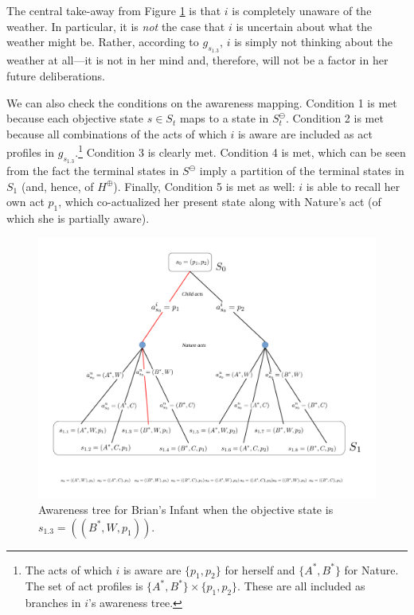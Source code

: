 \documentclass[
11pt,
titlepage,
reqno,
]{article}%
\theoremstyle{definition}
\begin{document}
The central take-away from Figure \ref{Diag: p-02} is that $i$ is completely unaware of the weather.
In particular, it is \textit{not} the case that $i$ is uncertain about what the weather might be.
Rather, according to $g_{s_{1.3}}$, $i$ is simply not thinking about the weather at all---it is not in her mind and, therefore, will not be a factor in her future deliberations.

We can also check the conditions on the awareness mapping. 
Condition 1 is met because each objective state $s\in S_t$ maps to a state in $S^\ominus_t$.
Condition 2 is met because all combinations of the acts of which $i$ is aware are included as act profiles in $g_{s_{1.3}}$.\footnote
{
	The acts of which $i$ is aware are $\{p_1,p_2\}$ for herself and $\{A^\ast,B^\ast\}$ for Nature. The set of act profiles is  $\{A^\ast,B^\ast\}\times \{p_1,p_2\}$. These are all included as branches in $i$'s awareness tree. 
}
Condition 3 is clearly met. 
Condition 4 is met, which can be seen from the fact the terminal states in $S^\ominus$ imply a partition of the terminal states in $S_1$ (and, hence, of $H^\oplus$).
Finally, Condition 5 is met as well: $i$ is able to recall her own act $p_1$, which co-actualized her present state along with Nature's act (of which she is partially aware).

\begin{figure}[h!]
	\centering
	\includegraphics*[page=2,trim = 0in 0in 0in 0in,scale=.6]{Awareness_Diagrams_All}
	\caption{Awareness tree for Brian's Infant when the objective state is $s_{1.3}=((B^\ast,W,p_1)) $.\label{Diag: p-02}}%
\end{figure}
	
\end{document}
